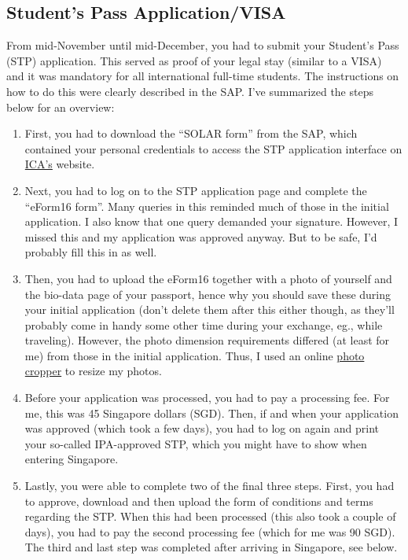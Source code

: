 \subsection*{Student's Pass Application/VISA}
{}
From mid-November until mid-December, you had to submit your Student's Pass (STP) application. This served as proof of your legal stay (similar to a VISA) and it was mandatory for all international full-time students. The instructions on how to do this were clearly described in the SAP. I've summarized the steps below for an overview:
\begin{enumerate}
    \item First, you had to download the ``SOLAR form'' from the SAP, which contained your personal credentials to access the STP application interface on \href{https://eservices.ica.gov.sg/solar/index.xhtml}{ICA's} website. 
    \item Next, you had to log on to the STP application page and complete the ``eForm16 form''. Many queries in this reminded much of those in the initial application. I also know that one query demanded your signature. However, I missed this and my application was approved anyway. But to be safe, I'd probably fill this in as well.
    \item Then, you had to upload the eForm16 together with a photo of yourself and the bio-data page of your passport, hence why you should save these during your initial application (don't delete them after this either though, as they'll probably come in handy some other time during your exchange, eg., while traveling). However, the photo dimension requirements differed (at least for me) from those in the initial application. Thus, I used an online \href{https://imageresizer.com}{photo cropper} to resize my photos. 
    \item Before your application was processed, you had to pay a processing fee. For me, this was 45 Singapore dollars (SGD). Then, if and when your application was approved (which took a few days), you had to log on again and print your so-called IPA-approved STP, which you might have to show when entering Singapore.
    \item Lastly, you were able to complete two of the final three steps. First, you had to approve, download and then upload the form of conditions and terms regarding the STP. When this had been processed (this also took a couple of days), you had to pay the second processing fee (which for me was 90 SGD). The third and last step was completed after arriving in Singapore, see below.
\end{enumerate}
